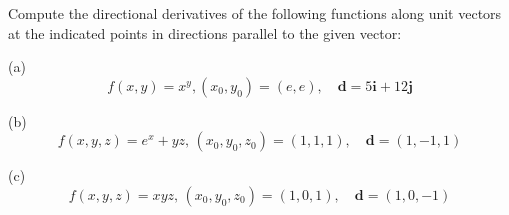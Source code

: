 \documentclass[openany]{book}
\begin{document}
\begin{prob}[2.6, Q3]
Compute the directional derivatives of the following functions along unit vectors at the indicated points in directions parallel to the given vector:

(a)
\begin{equation*}
    f(x, y) = x^y, (x_0, y_0) = (e, e), \quad \mathbf{d} = 5\mathbf{i} + 12\mathbf{j}
\end{equation*}

(b)  
\[
f(x, y, z) = e^x + yz, \, (x_0, y_0, z_0) = (1, 1, 1), \quad \mathbf{d} = (1, -1, 1)
\]

(c)  
\[
f(x, y, z) = xyz, \, (x_0, y_0, z_0) = (1, 0, 1), \quad \mathbf{d} = (1, 0, -1)
\]
\end{prob}
\end{document}
